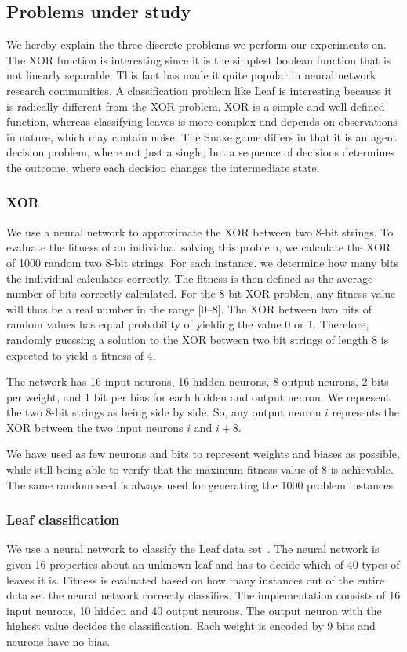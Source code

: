 \subsection{Problems under study}
\label{sec:problems}
We hereby explain the three discrete problems we perform our experiments on. 
The XOR function is interesting since it is the simplest boolean function that is not linearly separable. This fact has made it quite popular in neural network research communities\cite{masterThesisGANN}. A classification problem like Leaf is interesting because it is radically different from the XOR problem. XOR is a simple and well defined function, whereas classifying leaves is more complex and depends on observations in nature, which may contain noise. The Snake game differs in that it is an agent decision problem, where not just a single, but a sequence of decisions determines the outcome, where each decision changes the intermediate state.

\subsubsection{XOR}
We use a neural network to approximate the XOR between two 8-bit strings.
To evaluate the fitness of an individual solving this problem, we calculate the XOR of \num{1000} random two 8-bit strings.
For each instance, we determine how many bits the individual calculates correctly.
The fitness is then defined as the average number of bits correctly calculated.
For the 8-bit XOR problen, any fitness value will thus be a real number in the range $[0$--$8]$. 
The XOR between two bits of random values has equal probability of yielding the value 0 or 1.
Therefore, randomly guessing a solution to the XOR between two bit strings of length 8 is expected to yield a fitness of 4.

The network has 16 input neurons, 16 hidden neurons, 8 output neurons, 2 bits per weight, and 1 bit per bias for each hidden and output neuron. We represent the two 8-bit strings as being side by side. So, any output neuron $i$ represents the XOR between the two input neurons $i$ and $i+8$. 

We have used as few neurons and bits to represent weights and biases as possible, while still being able to verify that the maximum fitness value of 8 is achievable.
The same random seed is always used for generating the 1000 problem instances.

\subsubsection{Leaf classification}
We use a neural network to classify the Leaf data set~\cite{Bache+Lichman:2013, leafdataset}.
The neural network is given 16 properties about an unknown leaf and has to decide which of 40 types of leaves it is.
Fitness is evaluated based on how many instances out of the entire data set the neural network correctly classifies.
The implementation consists of 16 input neurons, 10 hidden and 40 output neurons. The output neuron with the highest value decides the classification. Each weight is encoded by 9 bits and neurons have no bias.

